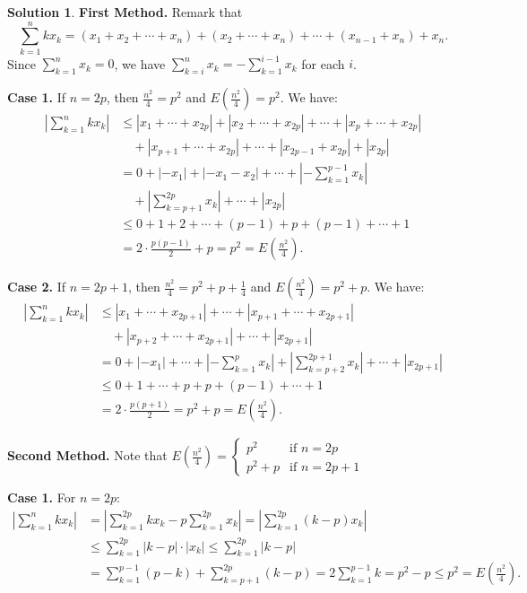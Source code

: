 \documentclass{article}
\theoremstyle{definition}
\newtheorem*{solution}{Solution}
\begin{document}
\begin{solution}

\textbf{First Method.} Remark that
\[
\sum_{k=1}^n kx_k = (x_1 + x_2 + \cdots + x_n) + (x_2 + \cdots + x_n) + \cdots + (x_{n-1} + x_n) + x_n.
\]
Since $\sum_{k=1}^n x_k = 0$, we have $\sum_{k=i}^n x_k = -\sum_{k=1}^{i-1} x_k$ for each $i$.

\textbf{Case 1.} If $n = 2p$, then $\frac{n^2}{4} = p^2$ and $E\left(\frac{n^2}{4}\right) = p^2$. We have:
\begin{align*}
\left|\sum_{k=1}^n kx_k\right| &\leq |x_1 + \cdots + x_{2p}| + |x_2 + \cdots + x_{2p}| + \cdots + |x_p + \cdots + x_{2p}| \\
&\quad + |x_{p+1} + \cdots + x_{2p}| + \cdots + |x_{2p-1} + x_{2p}| + |x_{2p}| \\
&= 0 + |-x_1| + |-x_1 - x_2| + \cdots + |-\sum_{k=1}^{p-1} x_k| \\
&\quad + |\sum_{k=p+1}^{2p} x_k| + \cdots + |x_{2p}| \\
&\leq 0 + 1 + 2 + \cdots + (p-1) + p + (p-1) + \cdots + 1 \\
&= 2\cdot\frac{p(p-1)}{2} + p = p^2 = E\left(\frac{n^2}{4}\right).
\end{align*}

\textbf{Case 2.} If $n = 2p+1$, then $\frac{n^2}{4} = p^2 + p + \frac{1}{4}$ and $E\left(\frac{n^2}{4}\right) = p^2 + p$. We have:
\begin{align*}
\left|\sum_{k=1}^n kx_k\right| &\leq |x_1 + \cdots + x_{2p+1}| + \cdots + |x_{p+1} + \cdots + x_{2p+1}| \\
&\quad + |x_{p+2} + \cdots + x_{2p+1}| + \cdots + |x_{2p+1}| \\
&= 0 + |-x_1| + \cdots + |-\sum_{k=1}^p x_k| + |\sum_{k=p+2}^{2p+1} x_k| + \cdots + |x_{2p+1}| \\
&\leq 0 + 1 + \cdots + p + p + (p-1) + \cdots + 1 \\
&= 2\cdot\frac{p(p+1)}{2} = p^2 + p = E\left(\frac{n^2}{4}\right).
\end{align*}

\textbf{Second Method.} Note that $E\left(\frac{n^2}{4}\right) = \begin{cases}
p^2 & \text{if } n = 2p \\
p^2 + p & \text{if } n = 2p+1
\end{cases}$

\textbf{Case 1.} For $n = 2p$:
\begin{align*}
\left|\sum_{k=1}^n kx_k\right| &= \left|\sum_{k=1}^{2p} kx_k - p\sum_{k=1}^{2p} x_k\right| = \left|\sum_{k=1}^{2p} (k-p)x_k\right| \\
&\leq \sum_{k=1}^{2p} |k-p| \cdot |x_k| \leq \sum_{k=1}^{2p} |k-p| \\
&= \sum_{k=1}^{p-1} (p-k) + \sum_{k=p+1}^{2p} (k-p) = 2\sum_{k=1}^{p-1} k = p^2 - p \leq p^2 = E\left(\frac{n^2}{4}\right).
\end{align*}


\end{solution}
\end{document}
